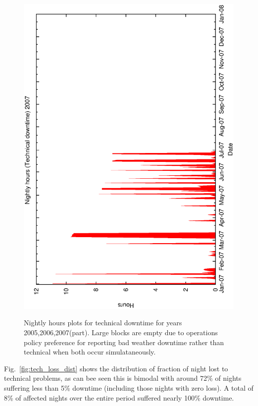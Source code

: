 \begin{figure}[htbp]
\begin{center}
{    \includegraphics[scale=0.4, angle=-90]{figures/ecs/met_nightly_stats_tech2007.eps}
  }
\caption{Nightly hours plots for technical downtime for years 2005,2006,2007(part). Large blocks are empty due to operations policy preference for reporting bad weather downtime rather than technical when both occur simulataneously.}
\end{center}
\label{fig:met_nightly_tech}
\end{figure}


Fig.~\ref{fig:tech_loss_dist} shows the distribution of fraction of night lost to technical problems, as can bee seen this is bimodal with around 72\% of nights suffering less than 5\% downtime (including those nights with zero loss). A total of 8\% of affected nights over the entire period suffered nearly 100\% downtime.  

